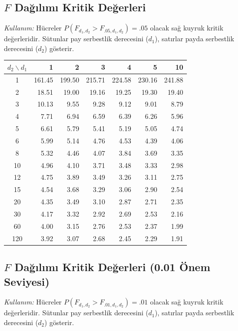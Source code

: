 \clearpage
\subsection{$F$ Dağılımı Kritik Değerleri}
\textit{Kullanım:} Hücreler $P(F_{d_1,d_2}>F_{.05,d_1,d_2})=.05$ olacak sağ kuyruk kritik değerleridir. Sütunlar pay serbestlik derecesini ($d_1$), satırlar payda serbestlik derecesini ($d_2$) gösterir.

\begin{center}
\small
\setlength{\tabcolsep}{6pt}
\begin{tabular}{c*{6}{r}}
\toprule
$d_2\backslash d_1$ & 1 & 2 & 3 & 4 & 5 & 10 \\
\midrule
1 & 161.45 & 199.50 & 215.71 & 224.58 & 230.16 & 241.88 \\
2 & 18.51 & 19.00 & 19.16 & 19.25 & 19.30 & 19.40 \\
3 & 10.13 & 9.55 & 9.28 & 9.12 & 9.01 & 8.79 \\
4 & 7.71 & 6.94 & 6.59 & 6.39 & 6.26 & 5.96 \\
5 & 6.61 & 5.79 & 5.41 & 5.19 & 5.05 & 4.74 \\
6 & 5.99 & 5.14 & 4.76 & 4.53 & 4.39 & 4.06 \\
8 & 5.32 & 4.46 & 4.07 & 3.84 & 3.69 & 3.35 \\
10 & 4.96 & 4.10 & 3.71 & 3.48 & 3.33 & 2.98 \\
12 & 4.75 & 3.89 & 3.49 & 3.26 & 3.11 & 2.75 \\
15 & 4.54 & 3.68 & 3.29 & 3.06 & 2.90 & 2.54 \\
20 & 4.35 & 3.49 & 3.10 & 2.87 & 2.71 & 2.35 \\
30 & 4.17 & 3.32 & 2.92 & 2.69 & 2.53 & 2.16 \\
60 & 4.00 & 3.15 & 2.76 & 2.53 & 2.37 & 1.99 \\
120 & 3.92 & 3.07 & 2.68 & 2.45 & 2.29 & 1.91 \\

\bottomrule
\end{tabular}
\end{center}


\clearpage
\subsection{$F$ Dağılımı Kritik Değerleri (0.01 Önem Seviyesi)}
\textit{Kullanım:} Hücreler $P(F_{d_1,d_2}>F_{.01,d_1,d_2})=.01$ olacak sağ kuyruk kritik değerleridir. Sütunlar pay serbestlik derecesini ($d_1$), satırlar payda serbestlik derecesini ($d_2$) gösterir.


